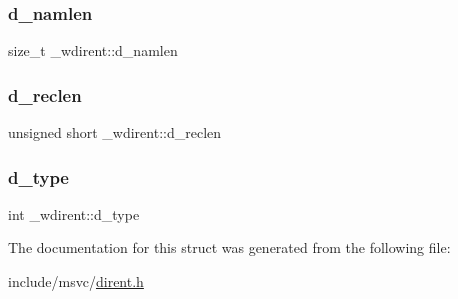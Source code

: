 \mbox{\label{struct__wdirent_a0050d6131e6fa90206903e216b38799e}} 
\subsubsection{\texorpdfstring{d\_namlen}{d\_namlen}}
{\footnotesize\ttfamily size\+\_\+t \+\_\+wdirent\+::d\+\_\+namlen}

\mbox{\label{struct__wdirent_aff7f360608e576cd18cf11f2caf13ef3}} 
\subsubsection{\texorpdfstring{d\_reclen}{d\_reclen}}
{\footnotesize\ttfamily unsigned short \+\_\+wdirent\+::d\+\_\+reclen}

\mbox{\label{struct__wdirent_a3c3874604ffccbeeaffd96709763cc3b}} 
\subsubsection{\texorpdfstring{d\_type}{d\_type}}
{\footnotesize\ttfamily int \+\_\+wdirent\+::d\+\_\+type}



The documentation for this struct was generated from the following file\+:\begin{DoxyCompactItemize}
\item 
include/msvc/\mbox{\hyperlink{dirent_8h}{dirent.\+h}}\end{DoxyCompactItemize}
